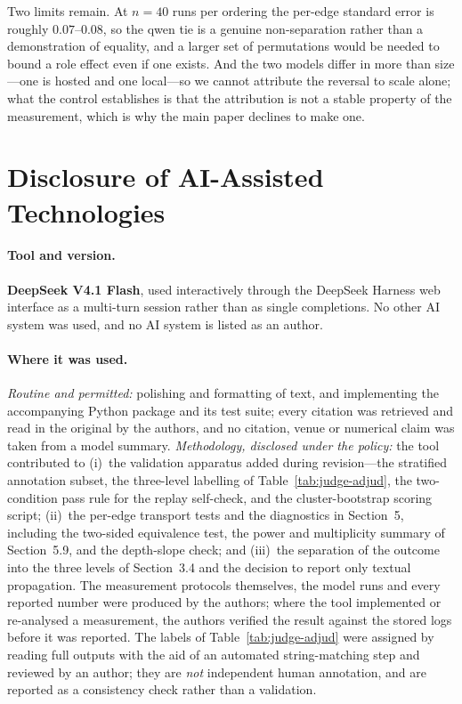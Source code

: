 \documentclass[sigconf,anonymous]{aamas}
\begin{document}
Two limits remain. At $n = 40$ runs per ordering the per-edge standard error is roughly
$0.07$--$0.08$, so the qwen tie is a genuine non-separation rather than a demonstration
of equality, and a larger set of permutations would be needed to bound a role effect
even if one exists. And the two models differ in more than size---one is hosted and one
local---so we cannot attribute the reversal to scale alone; what the control establishes
is that the attribution is not a stable property of the measurement, which is why the
main paper declines to make one.

\section{Disclosure of AI-Assisted Technologies}
\label{app:ai-disclosure}

\paragraph{Tool and version.} \textbf{DeepSeek V4.1 Flash}, used interactively through
the DeepSeek Harness web interface as a multi-turn session rather than as single
completions. No other AI system was used, and no AI system is listed as an author.

\paragraph{Where it was used.} \emph{Routine and permitted:} polishing and formatting
of text, and implementing the accompanying Python package and its test suite; every
citation was retrieved and read in the original by the authors, and no citation, venue
or numerical claim was taken from a model summary. \emph{Methodology, disclosed under
the policy:} the tool contributed to (i)~the validation apparatus added during
revision---the stratified annotation subset, the three-level labelling of
Table~\ref{tab:judge-adjud}, the two-condition pass rule for the replay self-check, and
the cluster-bootstrap scoring script; (ii)~the per-edge transport tests and the
diagnostics in Section~5, including the two-sided equivalence test, the power and
multiplicity summary of Section~5.9, and the depth-slope check; and (iii)~the separation
of the outcome into the three levels of Section~3.4 and the decision to report only
textual propagation. The measurement protocols themselves, the model runs and every
reported number were produced by the authors; where the tool implemented or re-analysed
a measurement, the authors verified the result against the stored logs before it was
reported. The labels of Table~\ref{tab:judge-adjud} were assigned by reading full
outputs with the aid of an automated string-matching step and reviewed by an author;
they are \emph{not} independent human annotation, and are reported as a consistency
check rather than a validation.
\end{document}
